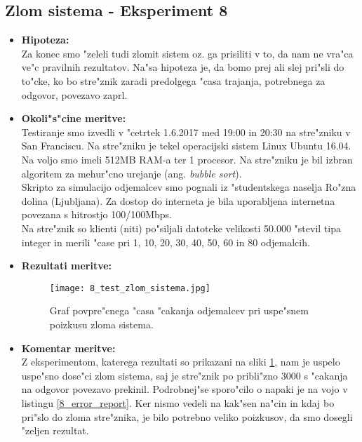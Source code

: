 \subsection{Zlom sistema - Eksperiment 8}
    \begin{itemize}
    	\item \textbf{Hipoteza: }  \\
    		Za konec smo "zeleli tudi zlomit sistem oz. ga prisiliti v to, da nam ne vra"ca ve"c pravilnih rezultatov. Na"sa hipoteza je, da bomo prej ali slej pri"sli do to"cke, ko bo stre"znik zaradi predolgega "casa trajanja, potrebnega za odgovor, povezavo zaprl.

    	\item \textbf{Okoli"s"cine meritve: } \\
    			Testiranje smo izvedli v "cetrtek 1.6.2017 med 19:00 in 20:30 na stre"zniku v San Franciscu. Na stre"zniku je tekel operacijski sistem Linux Ubuntu 16.04. Na voljo smo imeli 512MB RAM-a ter 1 procesor. Na stre"zniku je bil izbran algoritem za mehur"cno urejanje (ang. \textit{bubble sort}).\\ Skripto za simulacijo odjemalcev smo pognali iz "studentskega naselja Ro"zna dolina (Ljubljana). Za dostop do interneta je bila uporabljena internetna povezana s hitrostjo 100/100Mbps.\\ Na stre"znik so klienti (niti) po"siljali datoteke velikosti 50.000  "stevil tipa integer in merili "case pri 1, 10, 20, 30, 40, 50, 60 in 80 odjemalcih.

     	\item \textbf{Rezultati meritve: }  \\
    		\begin{figure}[h!]
  		\centering
  		  \texttt{[image: 8\_test\_zlom\_sistema.jpg]}
  		\caption{Graf povpre"cnega "casa "cakanja odjemalcev pri uspe"snem poizkusu zloma sistema. }
  		\label{8_graf_zlom_sistema}
		\end{figure}
    		 \newpage
    	\item \textbf{Komentar meritve: } \\
    		Z eksperimentom, katerega rezultati so prikazani na sliki \ref{8_graf_zlom_sistema}, nam je uspelo uspe"sno dose"ci zlom sistema, saj je stre"znik po pribli"zno 3000 s "cakanja na odgovor povezavo prekinil. Podrobnej"se sporo"cilo o napaki je na vojo v listingu \ref{8_error_report}.
		Ker nismo vedeli na kak"sen na"cin in kdaj bo pri"slo do zloma stre"znika, je bilo potrebno veliko poizkusov, da smo dosegli "zeljen rezultat.


\end{itemize}
